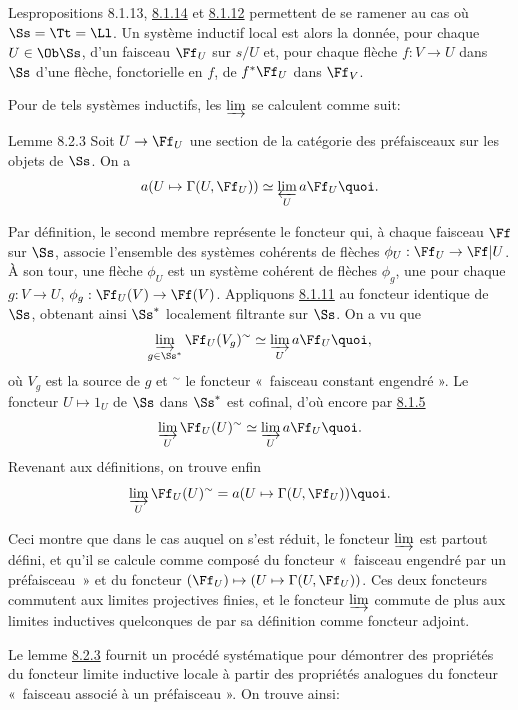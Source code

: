 Les\pageoriginale propositions 8.1.13,
\hyperref[V.prop8.1.14]{8.1.14} et \hyperref[V.prop8.1.12]{8.1.12} permettent de se ramener au
cas où $\Ss = \Tt = \Ll$. Un système inductif local est
alors la donnée, pour chaque $U \in \Ob \Ss$, d'un faisceau
$\Ff_U$ sur $s/U$ et, pour chaque flèche $f: V \to U$ dans $\Ss$
d'une flèche, fonctorielle en $f$, de $f^{\ast} \Ff_U$ dans
$\Ff_V$.

Pour de tels systèmes inductifs, les $\varinjlim$ se calculent
comme suit:

\begin{enonce*}{Lemme 8.2.3}
Soit $U \to \Ff_U$ une section de la catégorie des
préfaisceaux sur les objets de $\Ss$. On a
$$
a(U \mapsto \Gamma(U, \Ff_U)) \simeq \varprojlim_{U} a \Ff_U{\quoi}.
$$
\end{enonce*}

Par définition, le second membre représente le foncteur qui, à
chaque faisceau $\Ff$ sur $\Ss$, associe l'ensemble des systèmes
cohérents de flèches $\phi_U : \Ff_U \to \Ff|U$. À son tour, une
flèche $\phi_U$ est un système cohérent de flèches $\phi_g$, une
pour chaque $g : V \to U$, $\phi_g : \Ff_U (V) \to \Ff(V)$.
Appliquons \hyperref[V.lem8.1.11]{8.1.11} au foncteur identique de $\Ss$,
obtenant ainsi $\Ss^{\ast}$ localement filtrante sur $\Ss$. On a vu
que
$$
\varinjlim_{g \in \Ss^{\ast}} \Ff_U(V_g)^{\sim} \simeq
\varinjlim_{U} a \Ff_U{\quoi},
$$
où $V_g$ est la source de $g$ et ${}^{\sim}$ le foncteur « faisceau
constant engendré ». Le foncteur $U \mapsto 1_U$ de $\Ss$ dans $\Ss^{\ast}$
est cofinal, d'où encore par \hyperref[V.prop8.1.5]{8.1.5}
$$
\varinjlim_{U} \Ff_U(U)^{\sim} \simeq
\varinjlim_{U} a \Ff_U{\quoi}.
$$
Revenant aux définitions, on trouve enfin
$$
\varinjlim_{U} \Ff_U(U)^{\sim} = a (U \mapsto \Gamma(U,
\Ff_U)){\quoi}.
$$

Ceci montre que dans le cas auquel on s'est réduit, le foncteur
$\varinjlim$ est partout défini, et qu'il se calcule comme
composé du foncteur « faisceau engendré par un préfaisceau » et du
foncteur $(\Ff_U) \mapsto (U \mapsto \Gamma (U,
\Ff_U))$. Ces deux foncteurs commutent aux limites projectives
finies, et le foncteur $\varinjlim$ commute de plus aux
limites inductives quelconques de par sa définition comme foncteur
adjoint.

Le \pageoriginale lemme \hyperref[V.lem8.2.3]{8.2.3} fournit un procédé systématique pour
démontrer des propriétés du foncteur limite inductive locale à partir
des propriétés analogues du foncteur « faisceau associé à un
préfaisceau ». On trouve ainsi:

